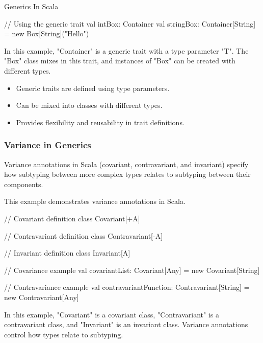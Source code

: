\begin{notes}{Generics In Scala}
\begin{highlight}
\begin{code}[Scala]
    // Using the generic trait
    val intBox: Container 
    val stringBox: Container[String] = new Box[String]("Hello")
    \end{code}
    
        In this example, "Container" is a generic trait with a type parameter "T". The "Box" class mixes in this trait, and instances of "Box" can be created with different types.
    
        \begin{itemize}
            \item Generic traits are defined using type parameters.
            \item Can be mixed into classes with different types.
            \item Provides flexibility and reusability in trait definitions.
        \end{itemize}
    
    \end{highlight}
    
    \subsubsection*{Variance in Generics}
    
    Variance annotations in Scala (covariant, contravariant, and invariant) specify how subtyping between more complex types relates to subtyping between their components.
    
    \begin{highlight}
    
        This example demonstrates variance annotations in Scala.
    
    \begin{code}[Scala]
    // Covariant definition
    class Covariant[+A]
    
    // Contravariant definition
    class Contravariant[-A]
    
    // Invariant definition
    class Invariant[A]
    
    // Covariance example
    val covariantList: Covariant[Any] = new Covariant[String]
    
    // Contravariance example
    val contravariantFunction: Contravariant[String] = new Contravariant[Any]
    \end{code}
    
        In this example, "Covariant" is a covariant class, "Contravariant" is a contravariant class, and "Invariant" is an invariant class. Variance annotations control how types relate to subtyping.
    

\end{highlight}
\end{notes}
